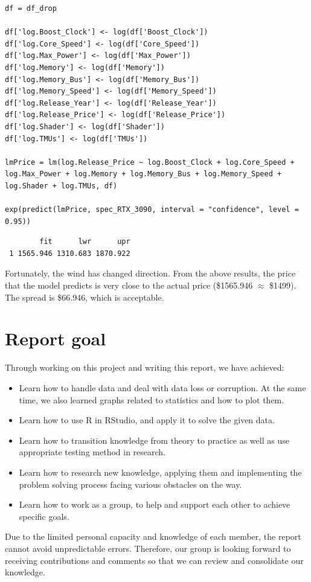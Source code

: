 \documentclass[a4paper]{article}
\begin{document}
\begin{mdframed}[leftline=false,rightline=false,backgroundcolor=lightblue!10,nobreak=false]
    \begin{verbatim}
df = df_drop

df['log.Boost_Clock'] <- log(df['Boost_Clock'])
df['log.Core_Speed'] <- log(df['Core_Speed'])
df['log.Max_Power'] <- log(df['Max_Power'])
df['log.Memory'] <- log(df['Memory'])
df['log.Memory_Bus'] <- log(df['Memory_Bus'])
df['log.Memory_Speed'] <- log(df['Memory_Speed'])
df['log.Release_Year'] <- log(df['Release_Year'])
df['log.Release_Price'] <- log(df['Release_Price'])
df['log.Shader'] <- log(df['Shader'])
df['log.TMUs'] <- log(df['TMUs'])

lmPrice = lm(log.Release_Price ~ log.Boost_Clock + log.Core_Speed + log.Max_Power + log.Memory + log.Memory_Bus + log.Memory_Speed + log.Shader + log.TMUs, df)

exp(predict(lmPrice, spec_RTX_3090, interval = "confidence", level = 0.95))
    \end{verbatim}
\end{mdframed}
\begin{lstlisting}
        fit      lwr      upr
 1 1565.946 1310.683 1870.922
\end{lstlisting}
Fortunately, the wind has changed direction. From the above results, the price that the model predicts is very close to the actual price (\$1565.946 $\approx$ \$1499). The spread is \$66.946, which is acceptable.


\section{Report goal}
Through working on this project and writing this report, we have achieved:
\begin{itemize}
    \item Learn how to handle data and deal with data loss or corruption. At the same time, we also learned graphs related to statistics and how to plot them.
    \item Learn how to use R in RStudio, and apply it to solve the given data.
    \item Learn how to transition knowledge from theory to practice as well as use appropriate testing method in research.
    \item Learn how to research new knowledge, applying them and implementing the problem solving process facing various obstacles on the way. 
    \item Learn how to work as a group, to help and support each other to achieve specific goals.
\end{itemize}
Due to the limited personal capacity and knowledge of each member, the report cannot avoid unpredictable errors. Therefore, our group is looking forward to receiving contributions and comments so that we can review and consolidate our knowledge.
\end{document}
